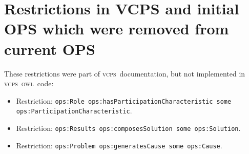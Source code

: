 \documentclass[10pt,letterpaper]{article}
\newcommand{\ops}{\textsc{ops}}
\newcommand{\vcps}{\textsc{vcps}}
\newcommand{\owl}{\textsc{owl}}
\newcommand{\bfo}{\textsc{bfo}}
\newcommand{\foaf}{\textsc{foaf}}
\begin{document}
\appendix

%
%
%
\section{Restrictions in VCPS and initial OPS which were removed from current OPS}\label{ap:restr}

These restrictions were part of \vcps\ documentation, but not implemented in \vcps\ \owl\ code:
\begin{itemize}
    \item Restriction: {\tt ops:Role ops:hasParticipationCharacteristic some ops:ParticipationCharacteristic}.
    \item Restriction: {\tt ops:Results ops:composesSolution some ops:Solution}.
    \item Restriction: {\tt ops:Problem ops:generatesCause some ops:Cause}.
\end{itemize}
\end{document}
